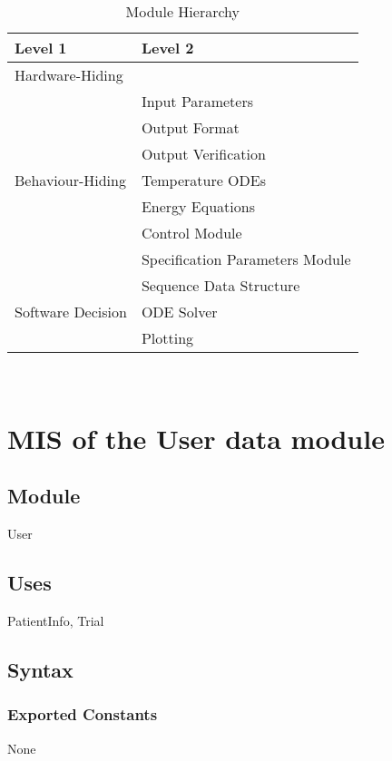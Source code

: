 \documentclass[12pt, titlepage]{article}
\begin{document}
\begin{table}[h!]
\centering
\begin{tabular}{p{} p{}}
\toprule
\textbf{Level 1} & \textbf{Level 2}\\
\midrule

{Hardware-Hiding} & ~ \\
\midrule

\multirow{7}{0.3\textwidth}{Behaviour-Hiding} & Input Parameters\\
& Output Format\\
& Output Verification\\
& Temperature ODEs\\
& Energy Equations\\ 
& Control Module\\
& Specification Parameters Module\\
\midrule

\multirow{3}{0.3\textwidth}{Software Decision} & {Sequence Data Structure}\\
& ODE Solver\\
& Plotting\\
\bottomrule

\end{tabular}
\caption{Module Hierarchy}
\label{TblMH}
\end{table}

\newpage
~\newpage

\section{MIS of the User data module} \label{User}

\subsection{Module}

User

\subsection{Uses}
PatientInfo, Trial

\subsection{Syntax}

\subsubsection{Exported Constants}
None
\end{document}
